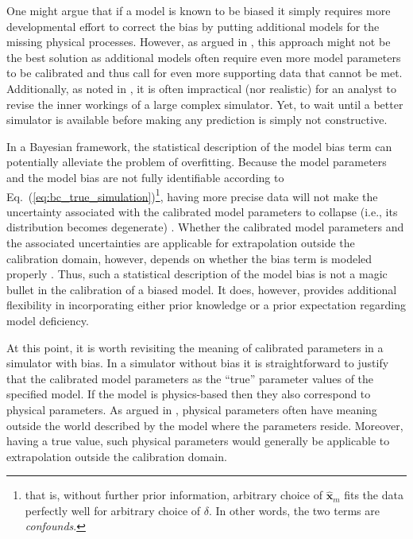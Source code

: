 One might argue that if a model is known to be biased it simply requires more developmental effort to correct the bias by putting additional models for the missing physical processes.
However, as argued in \cite{Arhonditsis2008,Wulff2007}, this approach might not be the best solution as additional models often require even more model parameters to be calibrated and thus call for even more supporting data that cannot be met.
Additionally, as noted in \cite{Campbell2006,Bayarri2007,Brynjarsdottir2014}, it is often impractical (nor realistic) for an analyst to revise the inner workings of a large complex simulator.
Yet, to wait until a better simulator is available before making any prediction is simply not constructive.

In a Bayesian framework, the statistical description of the model bias term can potentially alleviate the problem of overfitting.
Because the model parameters and the model bias are not fully identifiable according to Eq.~(\ref{eq:bc_true_simulation})\footnote{that is, without further prior information, arbitrary choice of $\hat{\bm{x}}_m$ fits the data perfectly well for arbitrary choice of $\delta$. In other words, the two terms are \emph{confounds}.}, 
having more precise data will not make the uncertainty associated with the calibrated model parameters to collapse (i.e., its distribution becomes degenerate) \cite{Bayarri2007,Brynjarsdottir2014}.
Whether the calibrated model parameters and the associated uncertainties are applicable for extrapolation outside the calibration domain, however, depends on whether the bias term is modeled properly \cite{Bayarri2007,Arhonditsis2008,Arendt2012,OHagan2013,Brynjarsdottir2014,Ling2014}.
Thus, such a statistical description of the model bias is not a magic bullet in the calibration of a biased model.
It does, however, provides additional flexibility in incorporating either prior knowledge or a prior expectation regarding model deficiency.

At this point, it is worth revisiting the meaning of calibrated parameters in a simulator with bias.
In a simulator without bias it is straightforward to justify that the calibrated model parameters as the ``true'' parameter values of the specified model.
If the model is physics-based then they also correspond to physical parameters.
As argued in \cite{OHagan2013,Brynjarsdottir2014}, physical parameters often have meaning outside the world described by the model where the parameters reside.
Moreover, having a true value, such physical parameters would generally be applicable to extrapolation outside the calibration domain.

